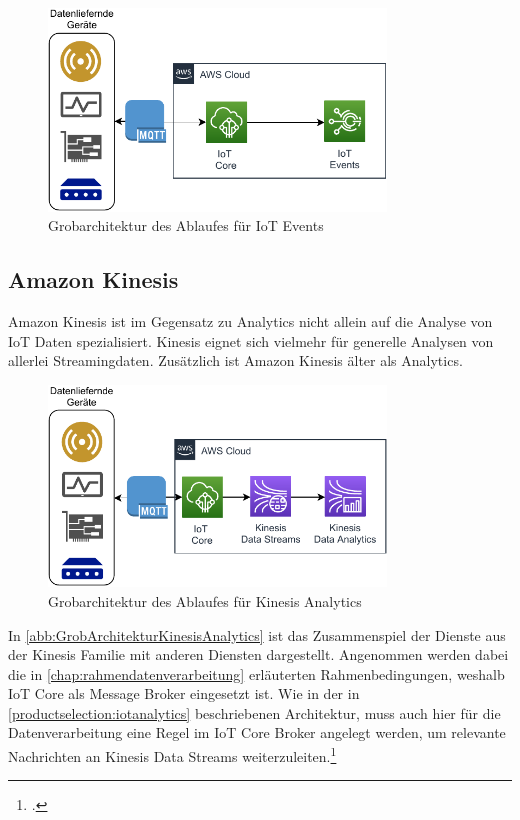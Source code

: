 \begin{figure}[H]
\centering
\includegraphics[width=0.8\textwidth]{graphics/IoT-Events-general.pdf}
\caption{Grobarchitektur des Ablaufes für IoT Events}
\label{abb:GrobArchitekturIoTEvents}
\end{figure}


\subsection{Amazon Kinesis}
Amazon Kinesis ist im Gegensatz zu \AWSIOT Analytics nicht allein auf die Analyse von \ac{IoT} Daten spezialisiert. Kinesis eignet sich vielmehr für generelle Analysen von allerlei Streamingdaten. Zusätzlich ist Amazon Kinesis älter als \AWSIOT Analytics.

\begin{figure}[H]
\centering
\includegraphics[width=0.8\textwidth]{graphics/Kinesis-Analytics-general.pdf}
\caption{Grobarchitektur des Ablaufes für Kinesis Analytics}
\label{abb:GrobArchitekturKinesisAnalytics}
\end{figure}
In \autoref{abb:GrobArchitekturKinesisAnalytics} ist das Zusammenspiel der Dienste aus der Kinesis Familie mit anderen Diensten dargestellt. Angenommen werden dabei die in \autoref{chap:rahmendatenverarbeitung} erläuterten Rahmenbedingungen, weshalb \ac{IoT} Core als Message Broker eingesetzt ist. Wie in der in \autoref{productselection:iotanalytics} beschriebenen Architektur, muss auch hier für die Datenverarbeitung eine Regel im \ac{IoT} Core Broker angelegt werden, um relevante Nachrichten an Kinesis Data Streams weiterzuleiten.\footcite[Vgl.][]{AmazonWebServicesInc..o.J.}

